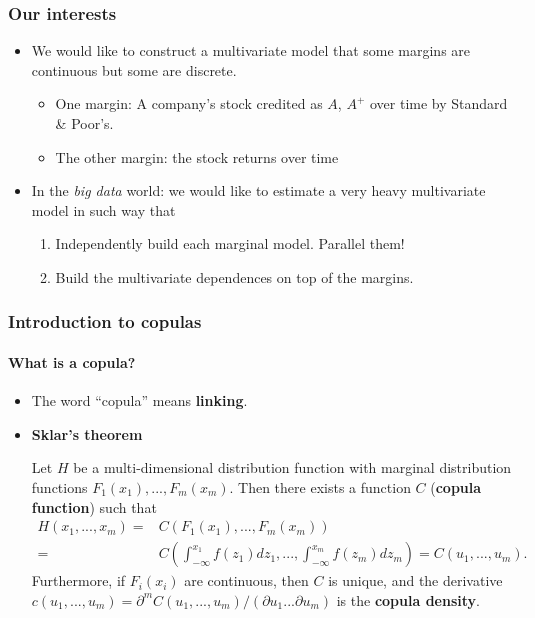 \documentclass{beamer}
\begin{document}
\begin{frame}
  \frametitle{Our interests}
  \begin{itemize}

  \item We would like to construct a multivariate model that some margins are
    continuous but some are discrete.

    \begin{itemize}
    \item One margin: A company's stock credited as $A$, $A^+$ over time by
      Standard \& Poor's.
    \item The other margin: the stock returns over time
    \end{itemize}

  \item In the \emph{big data} world: we would like to estimate a very heavy multivariate
    model in such way that
    \begin{enumerate}
    \item Independently build each marginal model. Parallel them!
    \item Build the multivariate dependences on top of the margins.
    \end{enumerate}

  \end{itemize}
\end{frame}


\begin{frame}
  \frametitle{Introduction to copulas}
  \framesubtitle{What is a copula?}
  \begin{itemize}
  \item The word ``copula'' means \textbf{linking}.
  \item \textbf{Sklar's theorem}

    Let $H$ be a multi-dimensional distribution function with marginal
    distribution functions $F_1(x_1),...,F_m(x_m)$. Then there exists a
    function $C$ (\textbf{copula function}) such that
    \begin{equation*}
      \begin{split}
        H(x_1,...,x_m)= & C(F_1(x_1),...,F_m(x_m))\\
        =&C\left(\int_{-\infty}^{x_1}f(z_1)dz_1,...,\int_{-\infty}^{x_m}f(z_m)dz_m\right)=C(u_1,...,u_m).
      \end{split}
    \end{equation*}
    Furthermore, if $F_i(x_i)$ are continuous, then $C$ is unique, and the derivative $c(u_1,...,u_m)= \partial^m C(u_1,...,u_m)/(\partial u_1...
    \partial u_m)$ is the \textbf{copula density}.

  \end{itemize}
\end{frame}
\end{document}
